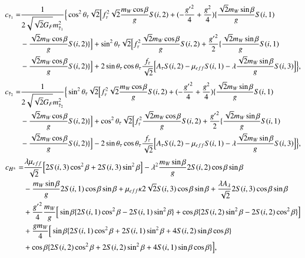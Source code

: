 \documentclass[final,3p,times,pdflatex]{elsarticle}
\begin{document}
\begin{equation}
\begin{aligned}
c_{\tilde{\tau}_1} = & {1 \over 2\sqrt{\sqrt{2}G_{F}} m_{\tilde{\tau}_1}^2}\Big\{\cos^2 \theta_{\tau} \sqrt{2}\Big[f_{\tau}^2 \sqrt{2} {m_{W} \cos\beta \over g} S(i,2) + (-{{g'}^2 \over 4} + {g^2 \over 4}) \{{\sqrt{2} m_{W} \sin\beta \over g} S(i,1) \\ & -{\sqrt{2} m_{W} \cos\beta \over g}S(i,2)\}\Big] + \sin^2 \theta_{\tau} \sqrt{2} \Big[ f_{\tau}^2 {\sqrt{2} m_{W} \cos\beta \over g}S(i,2) + {{g'}^2 \over 2}\{{\sqrt{2} m_{W} \sin\beta \over g}S(i,1) \\ & - {\sqrt{2} m_{W} \cos\beta \over g} S(i,2)\}\Big] + 2\sin\theta_{\tau} \cos\theta_{\tau} {f_{\tau} \over \sqrt{2}}\Big[A_{\tau}S(i,2) - \mu_{eff}S(i,1) - \lambda {\sqrt{2} m_{W} \sin\beta \over g}S(i,3)\Big]\Big\},
\end{aligned}
\end{equation}
\begin{equation}
\begin{aligned}
c_{\tilde{\tau}_2} = & {1 \over 2\sqrt{\sqrt{2}G_{F}} m_{\tilde{\tau}_2}^2}\Big\{\sin^2 \theta_{\tau} \sqrt{2}\Big[f_{\tau}^2 \sqrt{2} {m_{W} \cos\beta \over g} S(i,2) + (-{{g'}^2 \over 4} + {g^2 \over 4}) \{{\sqrt{2} m_{W} \sin\beta \over g} S(i,1) \\ & -{\sqrt{2} m_{W} \cos\beta \over g}S(i,2)\}\Big] + \cos^2 \theta_{\tau} \sqrt{2} \Big[ f_{\tau}^2 {\sqrt{2} m_{W} \cos\beta \over g}S(i,2) + {{g'}^2 \over 2}\{{\sqrt{2} m_{W} \sin\beta \over g}S(i,1) \\ & - {\sqrt{2} m_{W} \cos\beta \over g} S(i,2)\}\Big] - 2\sin\theta_{\tau} \cos\theta_{\tau} {f_{\tau} \over \sqrt{2}}\Big[A_{\tau}S(i,2) - \mu_{eff}S(i,1) - \lambda {\sqrt{2} m_{W} \sin\beta \over g}S(i,3)\Big]\Big\},
\end{aligned}
\end{equation}
\begin{equation}
\begin{aligned}
c_{H^{\pm}} = & {\lambda \mu_{eff} \over \sqrt{2}}\Big[2S(i,3)\cos^2 \beta + 2S(i,3)\sin^2 \beta\Big] - \lambda^2 {m_{W} \sin\beta \over g}2S(i,2)\cos\beta\sin\beta  \\ & - {m_{W} \sin\beta \over g}2S(i,1)\cos\beta\sin\beta + \mu_{eff} \kappa 2\sqrt{2} S(i,3)\cos\beta\sin\beta + {\lambda A_{\lambda} \over \sqrt{2}} 2S(i,3)\cos\beta\sin\beta \\ & + {{g'}^2 \over 4}{m_{W} \over g}\Big[\sin\beta \{2S(i,1)\cos^2 \beta - 2S(i,1) \sin^2 \beta\}  + \cos\beta\{2S(i,2)\sin^2 \beta - 2S(i,2) \cos^2 \beta\}\Big] \\ & + {g m_{W} \over 4}\Big[\sin\beta \{2S(i,1) \cos^2 \beta + 2S(i,1) \sin^2 \beta + 4S(i,2)\sin\beta\cos\beta\} \\ & + \cos\beta\{2S(i,2)\cos^2  \beta + 2S(i,2) \sin^2 \beta + 4S(i,1)\sin\beta\cos\beta\}\Big],
\end{aligned}
\end{equation}
\end{document}

